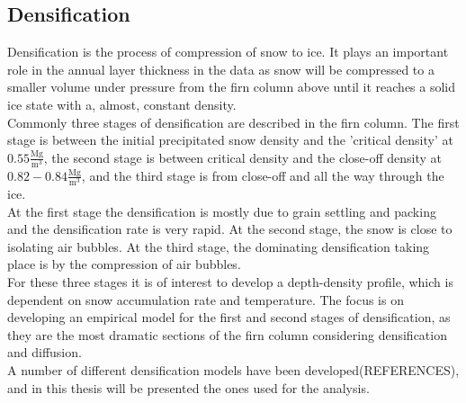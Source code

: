 \documentclass[../../CompleteThesis2/Complete_2ndDraft]{subfiles}
\begin{document}
\subsection[Densification][Densification]{Densification}
\label{Subsec:Ice_DiffusionAndDensification_Densification}
Densification is the process of compression of snow to ice. It plays an important role in the annual layer thickness in the data as snow will be compressed to a smaller volume under pressure from the firn column above until it reaches a solid ice state with a, almost, constant density. \\
Commonly three stages of densification are described in the firn column. The first stage is between the initial precipitated snow density and the 'critical density' at $0.55 \frac{\text{Mg}}{\text{m}^3}$, the second stage is between critical density and the close-off density at $0.82-0.84 \frac{\text{Mg}}{\text{m}^3}$, and the third stage is from close-off and all the way through the ice.\\
At the first stage the densification is mostly due to grain settling and packing and the densification rate is very rapid. At the second stage, the snow is close to isolating air bubbles. At the third stage, the dominating densification taking place is by the compression of air bubbles.\\
For these three stages it is of interest to develop a depth-density profile, which is dependent on snow accumulation rate and temperature. The focus is on developing an empirical model for the first and second stages of densification, as they are the most dramatic sections of the firn column considering densification and diffusion.\\
A number of different densification models have been developed(REFERENCES), and in this thesis will be presented the ones used for the analysis.
\end{document}
